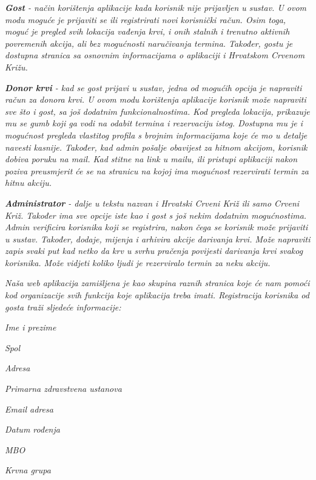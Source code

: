 		\begin{packed_item}
				\item \textit{\textbf{Gost} - način korištenja aplikacije kada korisnik nije prijavljen u sustav. U ovom modu moguće je prijaviti se ili registrirati novi korisnički račun. Osim toga, moguć je pregled svih lokacija vađenja krvi, i onih stalnih i trenutno aktivnih povremenih akcija, ali bez mogućnosti naručivanja termina. Također, gostu je dostupna stranica sa osnovnim informacijama o aplikaciji i Hrvatskom Crvenom Križu.}
				\item \textit{\textbf{Donor krvi} - kad se gost prijavi u sustav, jedna od mogućih opcija je napraviti račun za donora krvi. U ovom modu korištenja aplikacije korisnik može napraviti sve što i gost, sa još dodatnim funkcionalnostima. Kod pregleda lokacija, prikazuje mu se gumb koji ga vodi na odabit termina i rezervaciju istog. Dostupna mu je i mogućnost pregleda vlastitog profila s brojnim informacijama koje će mo u detalje navesti kasnije. Također, kad admin pošalje obavijest za hitnom akcijom, korisnik dobiva poruku na mail. Kad stitne na link u mailu, ili pristupi aplikaciji nakon poziva preusmjerit će se na stranicu na kojoj ima mogućnost rezervirati termin za hitnu akciju.}
				\item \textit{\textbf{Administrator} - dalje u tekstu nazvan i Hrvatski Crveni Križ ili samo Crveni Križ. Također ima sve opcije iste kao i gost s još nekim dodatnim mogućnostima. Admin verificira korisnika koji se registrira, nakon čega se korisnik može prijaviti u sustav. Također, dodaje, mijenja i arhivira akcije darivanja krvi. Može napraviti zapis svaki put kad netko da krv u svrhu pračenja povijesti darivanja krvi svakog korisnika. Može vidjeti koliko ljudi je rezerviralo termin za neku akciju.}
		\end{packed_item}

		\textit{Naša web aplikacija zamišljena je kao skupina raznih stranica koje će nam pomoći kod organizacije svih funkcija koje aplikacija treba imati. Registracija korisnika od gosta traži sljedeće informacije:}

		\begin{packed_item}
				\item \textit{Ime i prezime}
				\item \textit{Spol}
				\item \textit{Adresa}
				\item \textit{Primarna zdravstvena ustanova}
				\item \textit{Email adresa}
				\item \textit{Datum rođenja}
				\item \textit{MBO}
				\item \textit{Krvna grupa}
		\end{packed_item}

